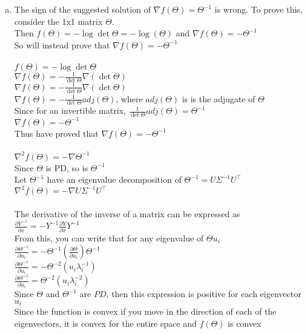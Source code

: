 \documentclass[11pt]{article}
\newcommand{\partialD}[2]{\frac{\partial #1}{\partial #2}}
\begin{document}
\begin{enumerate}[(a)]
\item
The sign of the suggested solution of $\nabla f(\Theta) = \Theta^{-1}$ is wrong. To prove this, consider the 1x1 matrix $\Theta$.\\
Then $f(\Theta) = - \log \det \Theta = -\log (\Theta)$ and $\nabla f(\Theta) = -\Theta^{-1}$\\
So will instead prove that $\nabla f(\Theta) = -\Theta^{-1}$\\
\\
$f(\Theta) = - \log \det \Theta$\\
$\nabla f(\Theta) = - \frac{1}{\det \Theta} \nabla (\det \Theta)$\\
$\nabla f(\Theta) = - \frac{1}{\det \Theta} \nabla (\det \Theta)$\\
$\nabla f(\Theta) = - \frac{1}{\det \Theta} adj (\Theta)$, where $adj(\Theta)$ is is the adjugate of $\Theta$\\
Since for an invertible matrix, $\frac{1}{\det \Theta} adj (\Theta) = \Theta^{-1}$\\  
$\nabla f(\Theta) = - \Theta^{-1}$\\
Thus have proved that $\nabla f(\Theta) = - \Theta^{-1}$\\
\\
$\nabla^2 f(\Theta) = - \nabla \Theta^{-1}$\\
Since $\Theta$ is PD, so is $\Theta^{-1}$\\
Let $\Theta^{-1}$ have an eigenvalue decomposition of $\Theta^{-1} = U \Sigma^{-1} U^\top$\\
$\nabla^2 f(\Theta) = - \nabla U \Sigma^{-1} U^\top$\\
\\
The derivative of the inverse of a matrix can be expressed as\\
$\partialD{Y^{-1}}{x} = -Y^{-1} \partialD{Y}{x} Y^{-1}$\\
From this, you can write that for any eigenvalue of $\Theta u_i$\\
$\partialD{\Theta^{-1}}{u_i} = - \Theta^{-1} (\partialD{\Theta}{u_i}) \Theta^{-1}$\\
$\partialD{\Theta^{-1}}{u_i} = - \Theta^{-2} (u_i \lambda_i^{-1})$\\
$\partialD{\Theta^{-1}}{u_i} =  \Theta^{-2} (u_i \lambda_i^{-2})$\\
Since $\Theta$ and $\Theta^{-1}$ are $PD$, then this expression is positive for each eigenvector $u_i$\\
Since the function is convex if you move in the direction of each of the eigenvectors, it is convex for the entire space and $f(\Theta)$ is convex


\end{enumerate}
\end{document}
